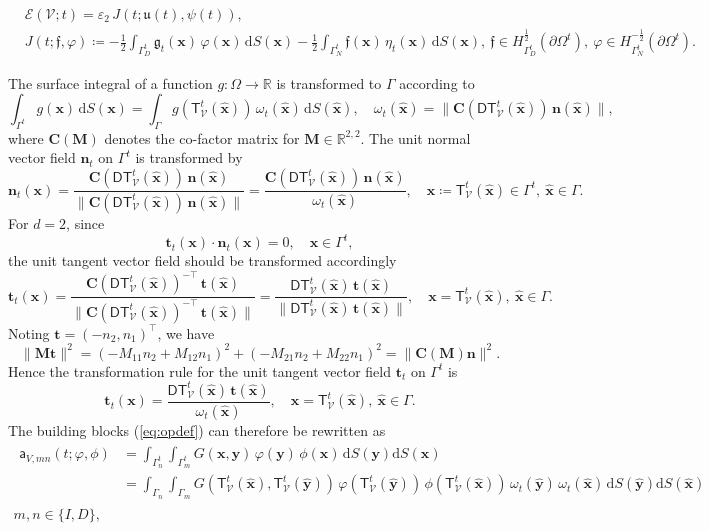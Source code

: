 \documentclass{article}
\theoremstyle{remark}
\newcommand{\T}{\mathsf{T}}
\newcommand{\aaa}{\mathsf{a}}
\newcommand{\x}{\boldsymbol{x}}
\newcommand{\y}{\boldsymbol{y}}
\newcommand{\dd}{\mathrm{d}}
\newcommand{\n}{\boldsymbol{n}}
\newcommand{\tg}{\boldsymbol{t}}
\newcommand{\hatx}{\widehat{\boldsymbol{x}}}
\newcommand{\haty}{\widehat{\boldsymbol{y}}}
\newcommand{\argu}{\mathfrak{u}}
\newcommand{\argf}{\mathfrak{f}}
\newcommand{\argg}{\mathfrak{g}}
\newcommand{\mat}[1]{\mathbf{#1}}
\newcommand{\Eps}{\mathcal{E}}
\newcommand{\Nu}{\mathcal{V}}
\newcommand{\Tt}{\T_\Nu^t}
\newcommand{\DTt}{\mathsf{DT}_\Nu^t}
\newcommand{\CDTt}[1]{\mat{C}(\DTt({#1}))}
\newcommand{\ot}{\omega_t}
\begin{document}
\begin{equation}
\begin{aligned}
    &\Eps(\Nu;t)=\varepsilon_2\,J(t;\argu(t),\psi(t)),\\
    &J(t;\argf,\varphi)\coloneqq-\frac{1}{2}\int_{\Gamma_D^t}\argg_t(\x)\,\varphi(\x)\,\dd S(\x)-\frac{1}{2}\int_{\Gamma_N^t}\argf(\x)\,\eta_t(\x)\,\dd S(\x),
    ~\argf\in H^{\frac{1}{2}}_{\Gamma_D^t}(\partial\Omega^t),
    ~\varphi\in H^{-\frac{1}{2}}_{\Gamma_N^t}(\partial\Omega^t).
\end{aligned}
\end{equation}

The surface integral of a function $g:\Omega\to\mathbb{R}$ is transformed to $\Gamma$ according to
\begin{equation}
    \int_{\Gamma^t}g(\x)\,\dd S(\x)=\int_{\Gamma}g(\Tt(\hatx))\,\ot(\hatx)\,\dd S(\hatx),\quad\ot(\hatx)=\|\CDTt{\hatx}\,\n(\hatx)\|,
\end{equation}
where $\mat{C}(\mat{M})$ denotes the co-factor matrix for $\mat{M}\in\mathbb{R}^{2,2}$. The unit normal vector field $\n_t$ on $\Gamma^t$ is transformed by
\begin{equation}
    \n_t(\x)=\frac{\CDTt{\hatx}\,\n(\hatx)}{\|\CDTt{\hatx}\,\n(\hatx)\|}=\frac{\CDTt{\hatx}\,\n(\hatx)}{\ot(\hatx)},\quad\x\coloneqq\Tt(\hatx)\in\Gamma^t,~\hatx\in\Gamma.
\end{equation}
For $d=2$, since
\begin{equation}
    \tg_t(\x)\cdot\n_t(\x)=0,\quad\x\in\Gamma^t,
\end{equation}
the unit tangent vector field should be transformed accordingly
\begin{equation}
    \tg_t(\x)=\frac{\CDTt{\hatx}^{-\top}\,\tg(\hatx)}{\|\CDTt{\hatx}^{-\top}\,\tg(\hatx)\|}=\frac{\DTt(\hatx)\,\tg(\hatx)}{\|\DTt(\hatx)\,\tg(\hatx)\|},\quad\x=\Tt(\hatx),~\hatx\in\Gamma.
\end{equation}
Noting $\tg=(-n_2,n_1)^\top$, we have
\begin{equation}
    \|\mat{M}\tg\|^2=(-M_{11}n_2+M_{12}n_1)^2+(-M_{21}n_2+M_{22}n_1)^2=\|\mat{C}(\mat{M})\n\|^2.
\end{equation}
Hence the transformation rule for the unit tangent vector field $\tg_t$ on $\Gamma^t$ is
\begin{equation}
    \tg_t(\x)=\frac{\DTt(\hatx)\,\tg(\hatx)}{\ot(\hatx)},\quad\x=\Tt(\hatx),~\hatx\in\Gamma.
\end{equation}
The building blocks (\ref{eq:opdef}) can therefore be rewritten as
\begin{multline*}
    \begin{aligned}
    \aaa_{V,mn}(t;\varphi,\phi)
    &=\int_{\Gamma_n^t}\int_{\Gamma_m^t}G(\x,\y)\,\varphi(\y)\,\phi(\x)\,\dd S(\y)\dd S(\x)&\\
    &=\int_{\Gamma_n}\int_{\Gamma_m}G(\Tt(\hatx),\Tt(\haty))\,\varphi(\Tt(\haty))\,\phi(\Tt(\hatx))\,\ot(\haty)\,\ot(\hatx)\,\dd S(\haty)\dd S(\hatx)
    \end{aligned}\\
    m, n\in\{I,D\},
\end{multline*}
\end{document}
